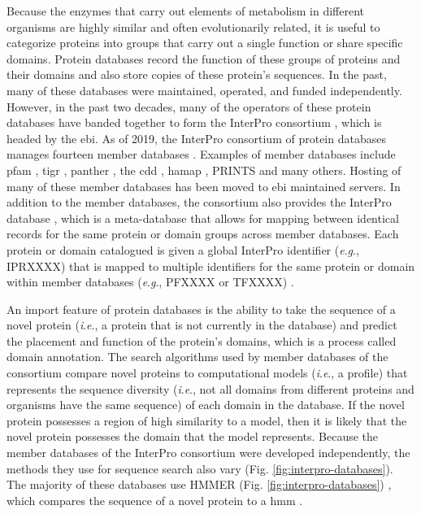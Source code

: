 Because the enzymes that carry out elements of metabolism in different organisms 
are highly similar and often evolutionarily related, it is useful to categorize 
proteins into groups that carry out a single function or share specific domains. 
Protein databases record the function of these groups of proteins and their 
domains and also store copies of these protein's sequences. In the past, many of 
these databases were maintained, operated, and funded independently. However, in 
the past two decades, many of the operators of these protein databases have 
banded together to form the InterPro consortium 
\cite{apweiler2000interpro,hunter2008interpro,Hunter2009}, which is headed by 
the \gls{ebi}\cite{cook2015european,finn2016interpro}. As of 2019, the InterPro 
consortium of protein databases manages fourteen member databases 
\cite{finn2016interpro,Hunter2009}. Examples of member databases include 
\gls{pfam} \cite{bateman2004pfam}, \gls{tigr} \cite{Haft2013}, \gls{panther} 
\cite{mi2005panther}, the \gls{cdd} \cite{marchler2014cdd}, \gls{hamap} 
\cite{lima2008hamap}, PRINTS \cite{attwood2000prints} and many others. Hosting 
of many of these member databases has been moved to \gls{ebi} maintained 
servers. In addition to the member databases, the consortium also provides the 
InterPro database \cite{hunter2008interpro,finn2016interpro}, which is a 
meta-database that allows for mapping between identical records for the same 
protein or domain groups across member databases. Each protein or domain 
catalogued is given a global InterPro identifier (\textit{e}.\textit{g}., 
IPRXXXX) that is mapped to multiple identifiers for the same protein or domain 
within member databases (\textit{e}.\textit{g}., PFXXXX or TFXXXX) 
\cite{hunter2008interpro,finn2016interpro}.

An import feature of protein databases is the ability to take the sequence of a 
novel protein (\textit{i}.\textit{e}., a protein that is not currently in the database) and 
predict the placement and function of the protein's domains, which is a process called 
domain annotation. The search algorithms used by member databases of the 
consortium compare novel proteins to computational models (\textit{i}.\textit{e}., a profile) that 
represents the sequence diversity (\textit{i}.\textit{e}., not all domains from different proteins 
and organisms have the same sequence) of each domain in the database. If the 
novel protein possesses a region of high similarity to a model, then it is 
likely that the novel protein possesses the domain that the model represents. 
Because the member databases of the InterPro consortium were developed 
independently, the methods they use for sequence search also vary (Fig. 
\ref{fig:interpro-databases}). The majority of these databases use HMMER (Fig. 
\ref{fig:interpro-databases}) \cite{eddy2011accelerated}, which compares the 
sequence of a novel protein to a \gls{hmm} \cite{de2007hidden}.

